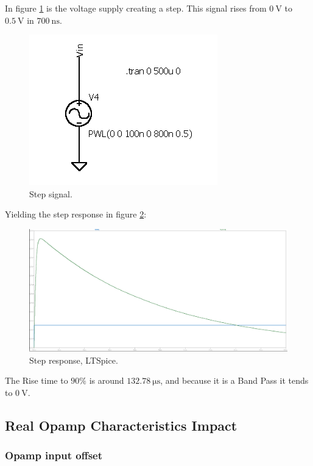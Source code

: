 In figure \ref{fig:StepSig} is the voltage supply creating a step. This signal rises from $\SI{0}{\volt}$ to $\SI{0.5}{\volt}$ in $\SI{700}{\nano\second}$.

\begin{figure}[H]
    \centering
    \includegraphics*[scale = 0.5]{Images/StepSig.png}
    \caption{Step signal.}
    \label{fig:StepSig}
\end{figure}


Yielding the step response in figure \ref{fig:StepLT}:

\begin{figure}[H]
    \centering
    \includegraphics*[scale = 0.25]{Images/StepResLT.png}
    \caption{Step response, LTSpice.}
    \label{fig:StepLT}
\end{figure}

The Rise time to $90\%$ is around $\SI{132.78}{\micro\second}$, and because it is a Band Pass it tends to $\SI{0}{\volt}$.
\newpage
\subsection{Real Opamp Characteristics Impact}

\subsubsection{Opamp input offset}

